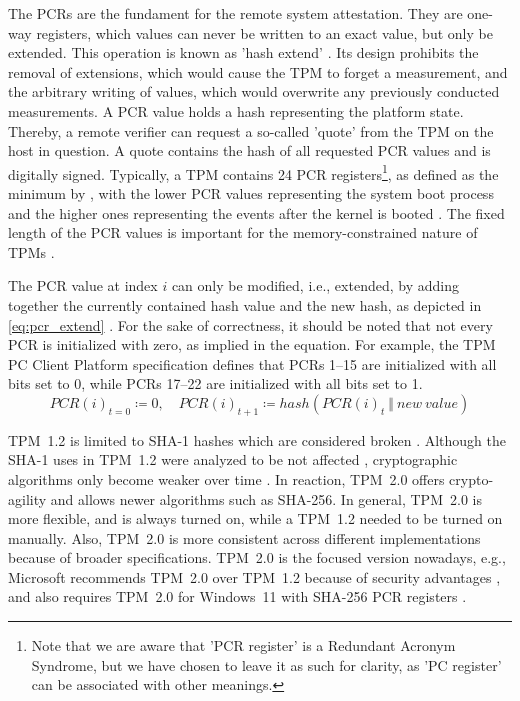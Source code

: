 The \acp{PCR} are the fundament for the remote system attestation. They are one-way registers, which values can never be written to an exact value, but only be extended.
This operation is known as 'hash extend' \cite{Arthur2015}.
Its design prohibits the removal of extensions, which would cause the TPM to forget a measurement, and the arbitrary writing of values, which would overwrite any previously conducted measurements.
A PCR value holds a hash representing the platform state.
Thereby, a remote verifier can request a so-called 'quote' from the TPM on the host in question.
A quote contains the hash of all requested PCR values and is digitally signed.
Typically, a TPM contains 24 PCR registers\footnote{Note that we are aware that 'PCR register' is a Redundant Acronym Syndrome, but we have chosen to leave it as such for clarity, as 'PC register' can be associated with other meanings.}, as defined as the minimum by \cite{tcgPcClient}, with the lower PCR values representing the system boot process and the higher ones representing the events after the kernel is booted \cite{Arthur2015}.
The fixed length of the \ac{PCR} values is important for the memory-constrained nature of TPMs \cite{Arthur2015}.

The PCR value at index $i$ can only be modified, i.e., extended, by adding together the currently contained hash value and the new hash, as depicted in \autoref{eq:pcr_extend} \cite{tpm}. For the sake of correctness, it should be noted that not every PCR is initialized with zero, as implied in the equation. For example, the TPM PC Client Platform specification \cite{tcgPcClient} defines that PCRs 1--15 are initialized with all bits set to 0, while PCRs 17--22 are initialized with all bits set to 1.
\begin{equation}
  \label{eq:pcr_extend}
PCR(i)_{t=0} \coloneqq 0,\quad PCR(i)_{t+1} \coloneqq hash(PCR(i)_t\ \Vert\ new\ value)
\end{equation}

%


TPM~1.2 is limited to SHA-1 hashes which are considered broken \cite{cryptoeprint:2005/010, Wang2005, Stevens2017}. Although the SHA-1 uses in TPM~1.2 were analyzed to be not affected \cite{sha1tpm12}, cryptographic algorithms only become weaker over time \cite{Arthur2015}. In reaction, TPM~2.0 offers crypto-agility and allows newer algorithms such as SHA-256. In general, TPM~2.0 is more flexible, and is always turned on, while a TPM~1.2 needed to be turned on manually. Also, TPM~2.0 is more consistent across different implementations because of broader specifications.
TPM~2.0 is the focused version nowadays, e.g., Microsoft recommends TPM~2.0 over TPM~1.2 because of security advantages \cite{micrec}, and also requires TPM~2.0 for Windows~11 with SHA-256 PCR registers \cite{win11req}.

